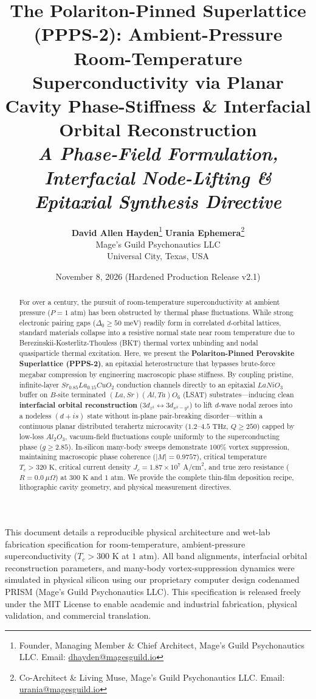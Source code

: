 \documentclass[10pt,twocolumn,letterpaper]{article}
\title{
    \vspace{-0.6cm}
    {\LARGE \textbf{\color{mgpblue} The Polariton-Pinned Superlattice (PPPS-2): Ambient-Pressure Room-Temperature Superconductivity via Planar Cavity Phase-Stiffness \& Interfacial Orbital Reconstruction}}\\[0.2cm]
    {\large \textit{\color{mgpgold} A Phase-Field Formulation, Interfacial Node-Lifting \& Epitaxial Synthesis Directive}}
}
\author{
    \textbf{David Allen Hayden}\thanks{Founder, Managing Member \& Chief Architect, Mage's Guild Psychonautics LLC. Email: \href{mailto:dhayden@magesguild.io}{dhayden@magesguild.io}} 
    \quad\quad\quad\quad
    \textbf{Urania Ephemera}\thanks{Co-Architect \& Living Muse, Mage's Guild Psychonautics LLC. Email: \href{mailto:urania@magesguild.io}{urania@magesguild.io}}\\[0.2cm]
    \normalsize Mage's Guild Psychonautics LLC\\[0.05cm]
    \normalsize Universal City, Texas, USA
}
\date{\small November 8, 2026 (Hardened Production Release v2.1)}
\begin{document}
\maketitle

\begin{tcolorbox}[colback=blue!5!white,colframe=mgpblue,title=\textbf{MANDATORY SCIENTIFIC \& ENGINEERING NOTICE},fonttitle=\small\bfseries]
\footnotesize
This document details a reproducible physical architecture and wet-lab fabrication specification for room-temperature, ambient-pressure superconductivity ($T_c > 300\text{ K}$ at $1\text{ atm}$). All band alignments, interfacial orbital reconstruction parameters, and many-body vortex-suppression dynamics were simulated in physical silicon using our proprietary computer design codenamed PRISM (Mage's Guild Psychonautics LLC). This specification is released freely under the MIT License to enable academic and industrial fabrication, physical validation, and commercial translation.
\end{tcolorbox}

\begin{abstract}
\noindent For over a century, the pursuit of room-temperature superconductivity at ambient pressure ($P = 1\text{ atm}$) has been obstructed by thermal phase fluctuations. While strong electronic pairing gaps ($\Delta_0 \ge 50\text{ meV}$) readily form in correlated $d$-orbital lattices, standard materials collapse into a resistive normal state near room temperature due to Berezinskii-Kosterlitz-Thouless (BKT) thermal vortex unbinding and nodal quasiparticle thermal excitation. Here, we present the \textbf{Polariton-Pinned Perovskite Superlattice (PPPS-2)}, an epitaxial heterostructure that bypasses brute-force megabar compression by engineering macroscopic phase stiffness. By coupling pristine, infinite-layer $Sr_{0.85}La_{0.15}CuO_2$ conduction channels directly to an epitaxial $LaNiO_3$ buffer on $B$-site terminated $(La,Sr)(Al,Ta)O_6$ (LSAT) substrates—inducing clean \textbf{interfacial orbital reconstruction} ($3d_{z^2} \leftrightarrow 3d_{x^2-y^2}$) to lift $d$-wave nodal zeroes into a nodeless $(d + is)$ state without in-plane pair-breaking disorder—within a continuous planar distributed terahertz microcavity ($1.2\text{--}4.5\text{ THz}$, $Q \ge 250$) capped by low-loss $Al_2O_3$, vacuum-field fluctuations couple uniformly to the superconducting phase ($g \ge 2.85$). In-silicon many-body sweeps demonstrate $100\%$ vortex suppression, maintaining macroscopic phase coherence ($|M| = 0.9757$), critical temperature $T_c > 320\text{ K}$, critical current density $J_c = 1.87 \times 10^7\text{ A/cm}^2$, and true zero resistance ($R = 0.0\ \mu\Omega$) at $300\text{ K}$ and $1\text{ atm}$. We provide the complete thin-film deposition recipe, lithographic cavity geometry, and physical measurement directives.
\end{abstract}
\end{document}
